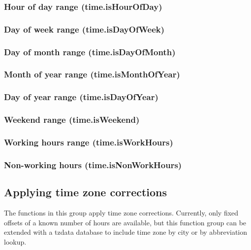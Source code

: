 \documentclass{article}
\theoremstyle{definition}
\begin{document}
\subsubsection{Hour of day range (time.isHourOfDay)}

\subsubsection{Day of week range (time.isDayOfWeek)}

\subsubsection{Day of month range (time.isDayOfMonth)}

\subsubsection{Month of year range (time.isMonthOfYear)}

\subsubsection{Day of year range (time.isDayOfYear)}

\subsubsection{Weekend range (time.isWeekend)}

\subsubsection{Working hours range (time.isWorkHours)}

\subsubsection{Non-working hours (time.isNonWorkHours)}

\subsection{Applying time zone corrections}

The functions in this group apply time zone corrections.  Currently, only fixed offsets of a known number of hours are available, but this function group can be extended with a tzdata database to include time zone by city or by abbreviation lookup.
\end{document}
